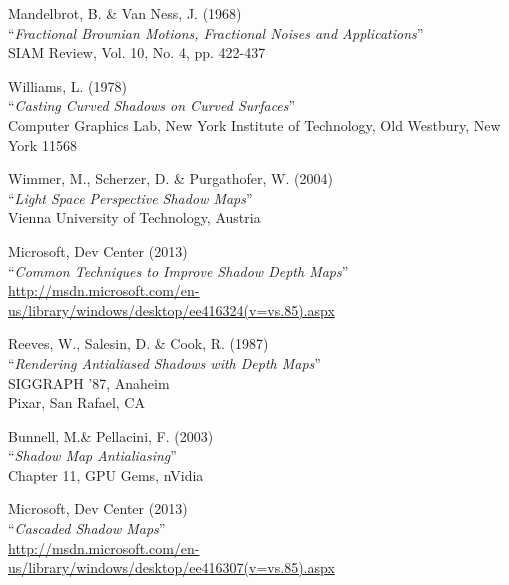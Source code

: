 \begin{thebibliography}{9}

	Mandelbrot, B. \& Van Ness, J. (1968) \\ 
	``\textit{Fractional Brownian Motions, Fractional Noises and Applications}'' \\
	SIAM Review, Vol. 10, No. 4, pp. 422-437
	
	Williams, L. (1978) \\ 
	``\textit{Casting Curved Shadows on Curved Surfaces}'' \\
	Computer Graphics Lab, New York Institute of Technology, Old Westbury, New York 11568 
	
	Wimmer, M., Scherzer, D. \& Purgathofer, W. (2004) \\ 
	``\textit{Light Space Perspective Shadow Maps}'' \\
	Vienna University of Technology, Austria
	
	Microsoft, Dev Center (2013) \\ 
	``\textit{Common Techniques to Improve Shadow Depth Maps}'' \\
	\href{http://msdn.microsoft.com/en-us/library/windows/desktop/ee416324(v=vs.85).aspx}{http://msdn.microsoft.com/en-us/library/windows/desktop/ee416324(v=vs.85).aspx}
		
	Reeves, W., Salesin, D. \& Cook, R. (1987) \\ 
	``\textit{Rendering Antialiased Shadows with Depth Maps}'' \\
	SIGGRAPH '87, Anaheim \\
	Pixar, San Rafael, CA 

	Bunnell, M.\& Pellacini, F. (2003) \\ 
	``\textit{Shadow Map Antialiasing}'' \\
	Chapter 11, GPU Gems, nVidia
	
	Microsoft, Dev Center (2013) \\ 
	``\textit{Cascaded Shadow Maps}'' \\
	\href{http://msdn.microsoft.com/en-us/library/windows/desktop/ee416307(v=vs.85).aspx}{http://msdn.microsoft.com/en-us/library/windows/desktop/ee416307(v=vs.85).aspx}
	
	


\end{thebibliography}
